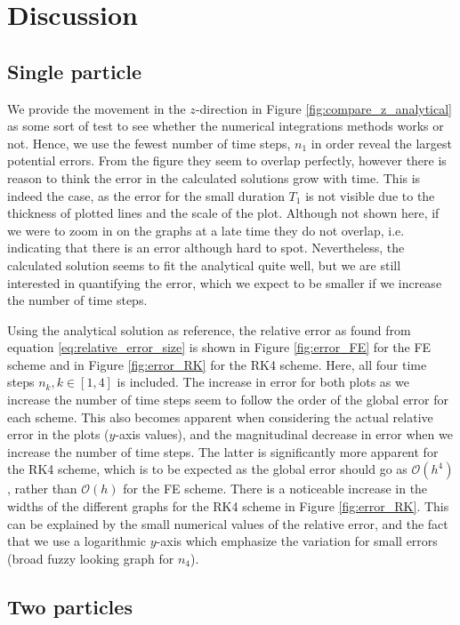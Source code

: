 \section{Discussion}\label{sec:discussion}

\subsection{Single particle}

We provide the movement in the $z$-direction in Figure \ref{fig:compare_z_analytical} as some sort of test to see whether the numerical integrations methods works or not. Hence, we use the fewest number of time steps, $n_1$ in order reveal the largest potential errors. From the figure they seem to overlap perfectly, however there is reason to think the error in the calculated solutions grow with time. This is indeed the case, as the error for the small duration $T_1$ is not visible due to the thickness of plotted lines and the scale of the plot. Although not shown here, if we were to zoom in on the graphs at a late time they do not overlap, i.e. indicating that there is an error although hard to spot. Nevertheless, the calculated solution seems to fit the analytical quite well, but we are still interested in quantifying the error, which we expect to be smaller if we increase the number of time steps. 

Using the analytical solution as reference, the relative error as found from equation \ref{eq:relative_error_size} is shown in Figure \ref{fig:error_FE} for the FE scheme and in Figure \ref{fig:error_RK} for the RK4 scheme. Here, all four time steps $n_k, k\in[1,4]$ is included. The increase in error for both plots as we increase the number of time steps seem to follow the order of the global error for each scheme. This also becomes apparent when considering the actual relative error in the plots ($y$-axis values), and the magnitudinal decrease in error when we increase the number of time steps. The latter is significantly more apparent for the RK4 scheme, which is to be expected as the global error should go as $\mathcal{O}(h^4)$, rather than $\mathcal{O}(h)$ for the FE scheme. There is a noticeable increase in the widths of the different graphs for the RK4 scheme in Figure \ref{fig:error_RK}. This can be explained by the small numerical values of the relative error, and the fact that we use a logarithmic $y$-axis which emphasize the variation for small errors (broad fuzzy looking graph for $n_4$).


\subsection{Two particles}


